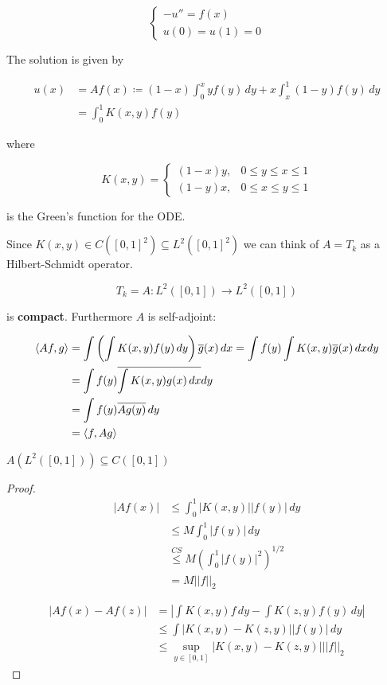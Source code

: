 \[\begin{cases}
    -u''=f(x)\\
    u(0)=u(1)=0
\end{cases}\]

The solution is given by 

\begin{align*}
    u(x)&=A f(x)\coloneqq (1-x)\int_0^x y f(y)\,dy+x\int_x^1 (1-y) f(y)\,dy\\
    &=\int_0^1 K(x,y)f(y)
\end{align*}

where 

\[K(x,y)=\begin{cases}
    (1-x)y, &0\leq y\leq x\leq 1\\
    (1-y)x, &0\leq x\leq y\leq 1
\end{cases}\]

is the Green's function for the ODE.

Since $K(x,y)\in C([0,1]^2)\subseteq L^2([0,1]^2)$ we can think of $A=T_k$ as a Hilbert-Schmidt operator.

\[T_k=A:L^2([0,1])\to L^2([0,1])\]

is \textbf{compact}. Furthermore $A$ is self-adjoint:

\begin{align*}\left\langle Af,g\right\rangle&=\int\left(\int K(x,y)f(y)\,dy\right)\overline{g}(x)\,dx=\int f(y)\int K(x,y)\overline{g}(x)\,dxdy\\
&=\int f(y)\overline{\int K(x,y)g(x)\,dx}dy\\
&=\int f(y)\overline{A g(y)}\,dy\\
&=\left\langle f,Ag\right\rangle\end{align*}

\begin{fproposition}
    $A(L^2([0,1]))\subseteq C([0,1])$
\end{fproposition}

\begin{proof}
    \begin{align*}
        |A f(x)|&\leq \int_0^1 |K(x,y)||f(y)|\,dy\\
        &\leq M\int_0^1 |f(y)|\,dy\\
        &\overset{CS}{\leq} M\left(\int_0^1 |f(y)|^2\right)^{1/2}\\
        &=M||f||_2
    \end{align*}

    \begin{align*}
        |Af(x)-Af(z)|&=\left|\int K(x,y)f\,dy-\int K(z,y)f(y)\,dy\right|\\
        &\leq \int |K(x,y)-K(z,y)||f(y)|\,dy\\
        &\leq \sup_{y\in[0,1]} |K(x,y)-K(z,y)|||f||_{2}
    \end{align*}
\end{proof}

